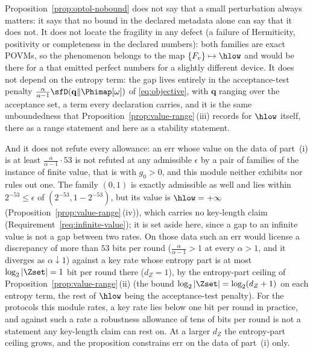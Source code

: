 \begin{remark}\label{rem:optol-direction}
Proposition~\ref{prop:optol-nobound} does not say that a small
perturbation always matters: it says that no bound in the declared
metadata alone can say that it does not. It does not locate the
fragility in any defect (a failure of Hermiticity, positivity or
completeness in the declared numbers): both families are exact POVMs, so the phenomenon belongs to the map
$\{F_v\}\mapsto\hlow$ and would be there for a  that emitted
perfect numbers for a slightly different device. It does not depend on
the entropy term: the gap lives entirely in the acceptance-test penalty
$\frac{\alpha}{\alpha-1}\sfD(\mathbf q\|\Phimap[\omega])$ of
\eqref{eq:objective}, with $\mathbf q$ ranging over the acceptance set, a
term every declaration carries, and it is the same unboundedness that
Proposition~\ref{prop:value-range}\,(iii) records for $\hlow$ itself, there
as a range statement and here as a stability statement.

And it does not refute every allowance: an $\mathrm{err}$ whose value on
the data of part~(i) is at least $\frac{\alpha}{\alpha-1}\cdot53$ is not
refuted at any admissible $\epsilon$ by a pair of families of the instance
of finite value, that is with $g_0>0$, and this module neither exhibits nor
rules out one. The family $(0,1)$ is exactly admissible as well and lies
within $2^{-53}\le\epsilon$ of $(2^{-53},1-2^{-53})$, but its value is
$\hlow=+\infty$ (Proposition~\ref{prop:value-range}\,(iv)), which carries
no key-length claim (Requirement~\ref{req:infinite-value}); it is set aside
here, since a gap to an infinite value is not a gap between two rates. On those data such an $\mathrm{err}$
would license a discrepancy of more than $53$ bits per round
($\frac{\alpha}{\alpha-1}>1$ at every $\alpha>1$, and it diverges as
$\alpha\downarrow1$) against a key rate whose entropy part is at most
$\log_2|\Zset|=1$ bit per round there ($d_Z=1$), by the entropy-part
ceiling of Proposition~\ref{prop:value-range}\,(ii) (the bound
$\log_2|\Zset|=\log_2(d_Z+1)$ on each entropy term, the rest of $\hlow$
being the acceptance-test penalty). For the protocols this module rates, a
key rate lies below one bit per round in practice, and against such a rate
a robustness allowance of tens of bits per round is not a statement any
key-length claim can rest on. At
a larger $d_Z$ the entropy-part ceiling grows, and the proposition
constrains $\mathrm{err}$ on the data of part~(i) only.


\end{remark}
